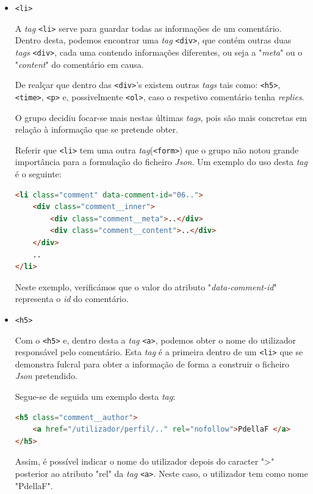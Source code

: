 \documentclass[a4paper,12pt]{report}
\newcommand*{\xml}[1]{\texttt{<#1>}}
\begin{document}
\begin{itemize}
    \item 
    \xml{li}
    \par A \textit{tag} \xml{li} serve para guardar todas as informações de um comentário. Dentro desta, podemos encontrar uma \textit{tag} \xml{div}, que contém outras duas \textit{tags} \xml{div}, cada uma contendo informações diferentes, ou seja a "\textit{meta}" ou o "\textit{content}" do comentário em causa.
    \par De realçar que dentro das \xml{div}'s existem outras \textit{tags} tais como: \xml{h5}, \xml{time}, \xml{p} e, possivelmente \xml{ol}, caso o respetivo comentário tenha \textit{replies}. 
    \par O grupo decidiu focar-se mais nestas últimas \textit{tags}, pois são mais concretas em relação à informação que se pretende obter. 
    \par Referir que \xml{li} tem uma outra \textit{tag}(\xml{form}) que o grupo não notou grande importância para a formulação do ficheiro \textit{Json}. 
    Um exemplo do uso desta \textit{tag} é o seguinte:
    
    \begin{center}
\begin{lstlisting}[language = html]
<li class="comment" data-comment-id="06..">
    <div class="comment__inner">
        <div class="comment__meta">..</div>
        <div class="comment__content">..</div>
    </div>
    ..
</li>
    \end{lstlisting}    
\end{center} 
    Neste exemplo, verificámos que o valor do atributo "\textit{data-comment-id}" representa o \textit{id   } do comentário.
\end{itemize}

\vspace{0.4cm}

\begin{itemize}
    \item 
    \xml{h5}
    \par Com o \xml{h5} e, dentro desta a \textit{tag} \xml{a}, podemos obter o nome do utilizador responsável pelo comentário. Esta \textit{tag} é a primeira dentro de um \xml{li} que se demonstra fulcral para obter a informação de forma a construir o ficheiro \textit{Json} pretendido.
    \par Segue-se de seguida um exemplo desta \textit{tag}:
    
        \begin{center}
\begin{lstlisting}[language = html]
<h5 class="comment__author">
    <a href="/utilizador/perfil/.." rel="nofollow">PdellaF </a>
</h5>
    \end{lstlisting}    
\end{center} 
    \par Assim, é possível indicar o nome do utilizador depois do caracter "\textgreater" posterior ao atributo "rel" da  \textit{tag} \xml{a}. Neste caso, o utilizador tem como nome "PdellaF".
\end{itemize}
\end{document}
